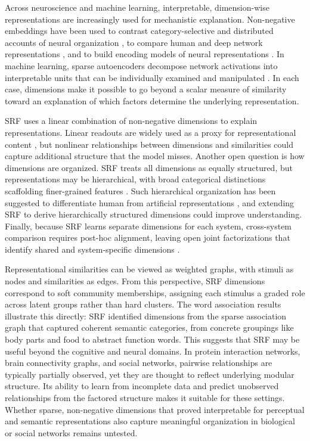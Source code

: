 \documentclass{article}
\begin{document}
Across neuroscience and machine learning, interpretable, dimension-wise representations are increasingly used for mechanistic explanation. Non-negative embeddings have been used to contrast category-selective and distributed accounts of neural organization \citep{Khosla2022,Contier2024}, to compare human and deep network representations \citep{Mahner2025,Du2025}, and to build encoding models of neural representations \citep{Zeng2025,Klindt2025}. In machine learning, sparse autoencoders decompose network activations into interpretable units that can be individually examined and manipulated \citep{Bricken2023,Cunningham2024}. In each case, dimensions make it possible to go beyond a scalar measure of similarity toward an explanation of which factors determine the underlying representation. 

SRF uses a linear combination of non-negative dimensions to explain representations. Linear readouts are widely used as a proxy for representational content \citep{DiCarlo2012,Majaj2015}, but nonlinear relationships between dimensions and similarities could capture additional structure that the model misses. Another open question is how dimensions are organized. SRF treats all dimensions as equally structured, but representations may be hierarchical, with broad categorical distinctions scaffolding finer-grained features \citep{Costa2025}. Such hierarchical organization has been suggested to differentiate human from artificial representations \citep{Muttenthaler2025}, and extending SRF to derive hierarchically structured dimensions could improve understanding. Finally, because SRF learns separate dimensions for each system, cross-system comparison requires post-hoc alignment, leaving open joint factorizations that identify shared and system-specific dimensions \citep{Thasarathan2025}.

Representational similarities can be viewed as weighted graphs, with stimuli as nodes and similarities as edges. From this perspective, SRF dimensions correspond to soft community memberships, assigning each stimulus a graded role across latent groups rather than hard clusters. The word association results illustrate this directly: SRF identified dimensions from the sparse association graph that captured coherent semantic categories, from concrete groupings like body parts and food to abstract function words. This suggests that SRF may be useful beyond the cognitive and neural domains. In protein interaction networks, brain connectivity graphs, and social networks, pairwise relationships are typically partially observed, yet they are thought to reflect underlying modular structure. Its ability to learn from incomplete data and predict unobserved relationships from the factored structure makes it suitable for these settings. Whether sparse, non-negative dimensions that proved interpretable for perceptual and semantic representations also capture meaningful organization in biological or social networks remains untested.
\end{document}
